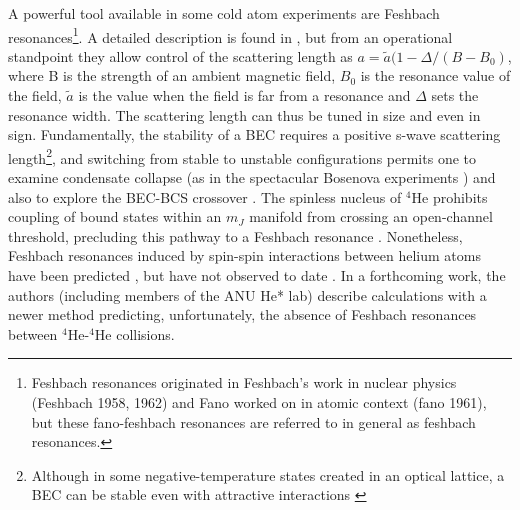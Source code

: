 	A powerful tool available in some cold atom experiments are Feshbach resonances\footnote{Feshbach resonances originated in Feshbach's work in nuclear physics (Feshbach 1958, 1962) and Fano worked on in atomic context (fano 1961), but these fano-feshbach resonances are referred to in general as feshbach resonances.
	}.
	A detailed description is found in \cite{Chin10}, but from an operational standpoint they allow control of the scattering length as $a = \tilde{a}(1-\Delta/(B-B_0)$, where B is the strength of an ambient magnetic field, $B_0$ is the resonance value of the field, $\tilde{a}$ is the value when the field is far from a resonance and $\Delta$ sets the resonance width.
	The scattering length can thus be tuned in size and even in sign.
	Fundamentally, the stability of a BEC requires a positive s-wave scattering length\footnote{Although in some negative-temperature states created in an optical lattice, a BEC can be stable even with attractive interactions \cite{Braun13}}, and switching from stable to unstable configurations permits one to examine condensate collapse (as in the spectacular Bosenova experiments \cite{papers}) and also to explore the BEC-BCS crossover \cite{papers}.
	The spinless nucleus of $^4$He prohibits coupling of bound states within an $m_J$ manifold from crossing an open-channel threshold, precluding this pathway to a Feshbach resonance \cite{goosen10}.
	Nonetheless, Feshbach resonances induced by spin-spin interactions between helium atoms have been predicted \cite{venturi99, goosen10}, but have not observed to date \cite{borbely12}.
	In a forthcoming work, the authors (including members of the ANU He* lab) describe calculations with a newer method predicting, unfortunately, the absence of Feshbach resonances between $^4$He-$^4$He collisions.
	
